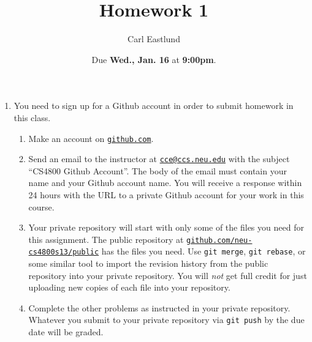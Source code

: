 \documentclass{article}
\title{Homework 1}
\author{Carl Eastlund}
\date{Due \textbf{Wed., Jan. 16} at \textbf{9:00pm}.}
\newcommand\link[2][http://]{\href{#1#2}{\nolinkurl{#2}}}
\newcommand\email[1]{\link[mailto:]{#1}}
\begin{document}
\maketitle

\begin{enumerate}

\pagebreak[1]
\item
  You need to sign up for a Github account in order to submit homework in this
  class.
  \begin{enumerate}
  \item
    Make an account on \link{github.com}.
  \item
    Send an email to the instructor at \email{cce@ccs.neu.edu} with the subject
    ``CS4800 Github Account''.  The body of the email must contain your name and
    your Github account name.  You will receive a response within 24 hours with
    the URL to a private Github account for your work in this course.
  \item
    Your private repository will start with only some of the files you need for
    this assignment.  The public repository at
    \link{github.com/neu-cs4800s13/public} has the files you need.  Use
    \texttt{git merge}, \texttt{git rebase}, or some similar tool to import the
    revision history from the public repository into your private repository.
    You will \emph{not} get full credit for just uploading new copies of each
    file into your repository.
  \item
    Complete the other problems as instructed in your private repository.
    Whatever you submit to your private repository via \texttt{git push} by the
    due date will be graded.
  \end{enumerate}


\end{enumerate}
\end{document}
